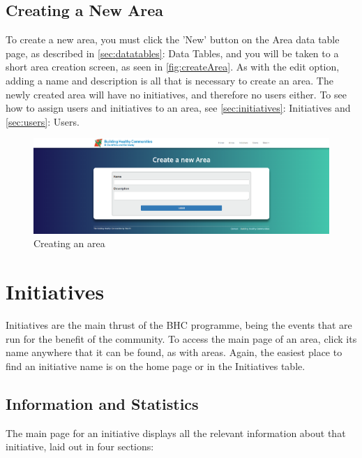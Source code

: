 \documentclass{bhcguides}
\begin{document}
\subsection{Creating a New Area}
\label{ssec:createarea}

To create a new area, you must click the 'New' button on the Area data table page, as described in \autoref{sec:datatables}: Data Tables, and you will be taken to a short area creation screen, as seen in \autoref{fig:createArea}. As with the edit option, adding a name and description is all that is necessary to create an area. The newly created area will have no initiatives, and therefore no users either. To see how to assign users and initiatives to an area, see \autoref{sec:initiatives}: Initiatives and \autoref{sec:users}: Users.

\begin{figure}[h!]
 \centerline{\includegraphics[width=\textwidth, height=\textheight, keepaspectratio]{createarea.png}}
 \caption{Creating an area}
 \label{fig:createArea}
\end{figure}

\section{Initiatives}
\label{sec:initiatives}

Initiatives are the main thrust of the BHC programme, being the events that are run for the benefit of the community. To access the main page of an area, click its name anywhere that it can be found, as with areas. Again, the easiest place to find an initiative name is on the home page or in the Initiatives table.

\subsection{Information and Statistics}
\label{ssec:initinfoandstats}

The main page for an initiative displays all the relevant information about that initiative, laid out in four sections:
\end{document}

